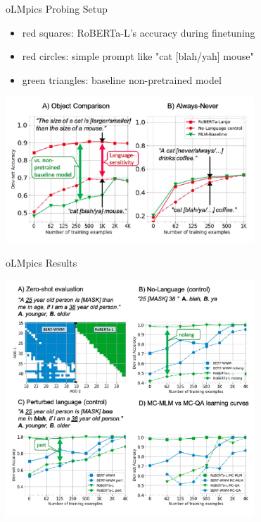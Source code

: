 \begin{vbframe}{oLMpics Probing Setup}
	\vfill
	\begin{itemize}
		\item red squares: RoBERTa-L's accuracy during finetuning
		\item red circles: simple prompt like "cat [blah/yah] mouse"
		\item green triangles: baseline non-pretrained model
	\end{itemize}
	\includegraphics[width=0.7\textwidth]{evaluation_figures/olmpics_setup.png}
	\vfill
\end{vbframe}

\begin{vbframe}{oLMpics Results}

	\includegraphics[width=0.7\textwidth]{evaluation_figures/olmpics_results.png}
\end{vbframe}

